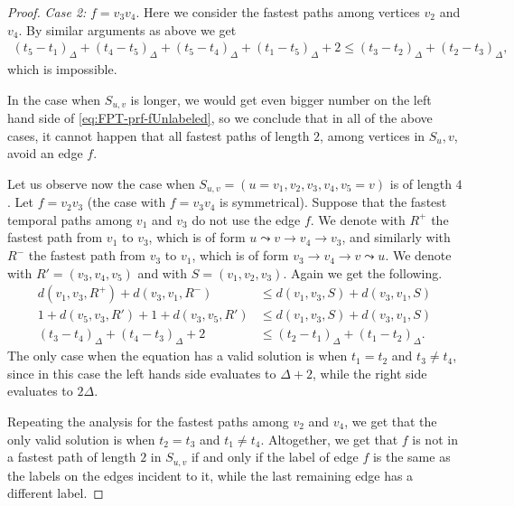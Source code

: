 \documentclass[a4paper,UKenglish,cleveref, autoref, thm-restate]{lipics-v2021}
\begin{document}
\begin{proof}
    \emph{Case 2: }$f = v_3v_4$.
    Here we consider the fastest paths among vertices $v_{2}$ and $v_{4}$.
    By similar arguments as above we get
    \begin{align*}
        (t_5 - t_1)_\Delta + (t_4 - t_5)_\Delta + (t_5 - t_4)_\Delta + (t_1 - t_5)_\Delta + 2 \leq (t_3 - t_2)_\Delta + (t_2 - t_3)_\Delta,
    \end{align*}
    which is impossible.
    
    In the case when $S_{u,v}$ is longer, we would get even bigger number on the left hand side of \cref{eq:FPT-prf-fUnlabeled}, 
    so we conclude that in all of the above cases, it cannot happen that all fastest paths of length $2$, among vertices in $S{_u,v}$, avoid an edge $f$.

    Let us observe now the case when $S_{u,v} = (u=v_1,v_2, v_3, v_4, v_5=v)$ is of length $4$.
    Let $f = v_2 v_3$ (the case with $f = v_3 v_4$ is symmetrical).
    Suppose that the fastest temporal paths among $v_1$ and $v_3$ do not use the edge $f$.
    We denote with $R^+$ the fastest path from $v_1$ to $v_3$, 
    which is of form $u \leadsto v \rightarrow v_4 \rightarrow v_3$,
    and similarly 
    with $R^-$ the fastest path from $v_3$ to $v_1$, which is
    of form $v_3 \rightarrow v_4 \rightarrow v \leadsto u$.
    We denote with $R' = (v_3, v_4, v_5)$ and with $S = (v_1,v_2,v_3)$.
    Again we get the following.
    \begin{equation*}
    \begin{split}
        d(v_{1}, v_{3}, R^+) + d(v_{3}, v_{1}, R^-) &\leq 
        d(v_{1}, v_{3}, S) + d(v_{3}, v_{1}, S) \\
        1 + d(v_5,v_3,R') + 1 + d(v_3,v_5,R') &\leq d(v_{1}, v_{3}, S) + d(v_{3}, v_{1}, S) \\
        (t_3 - t_4)_\Delta + (t_4 - t_3)_\Delta + 2 
        &\leq 
        (t_2 - t_1)_\Delta + (t_1 - t_2)_\Delta.        
    \end{split}
    \end{equation*}
    The only case when the equation has a valid solution is when $t_1 = t_2$ and $t_3 \neq t_4$,
    since in this case the left hands side evaluates to $\Delta + 2$, while the right side evaluates to $2 \Delta$.
    
    Repeating the analysis for the fastest paths among $v_2$ and $v_4$,
    we get that the only valid solution is when $t_2 = t_3$ and $t_1 \neq t_4$.
    Altogether, we get that $f$ is not in a fastest path of length $2$ in $S_{u,v}$ if and only if the label of edge $f$ is the same as the labels on the edges incident to it, while the last remaining edge has a different label.
\end{proof}
\end{document}
